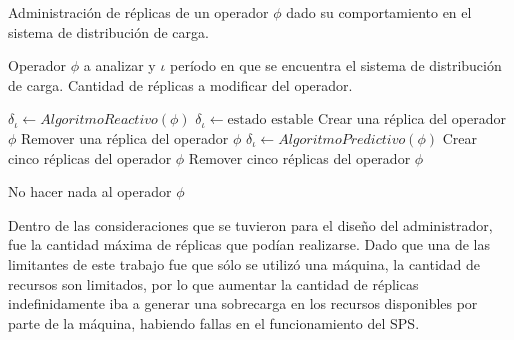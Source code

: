 \begin{algorithm}[!hb]
	\caption{Administración de réplicas de un operador $\phi$ dado su comportamiento en el sistema de distribución de carga.}
	\label{alg:administracion}
	\begin{algorithmic}[1]
	\REQUIRE Operador $\phi$ a analizar y $\iota$ período en que se encuentra el sistema de distribución de carga.
	\ENSURE Cantidad de réplicas a modificar del operador.	
	
		\STATE $\delta_{\iota} \leftarrow AlgoritmoReactivo(\phi)$
				\STATE $\delta_{\iota} \leftarrow \text{estado estable}$ 
				\RETURN Crear una réplica del operador $\phi$
			\ENDIF
			\RETURN Remover una réplica del operador $\phi$
		\ENDIF 
	\ELSE
		\STATE $\delta_{\iota} \leftarrow AlgoritmoPredictivo(\phi)$
				\RETURN Crear cinco réplicas del operador $\phi$
			\ENDIF
			\RETURN Remover cinco réplicas del operador $\phi$
		\ENDIF
	\ENDIF
	
	\RETURN No hacer nada al operador $\phi$
	
	\end{algorithmic}
\end{algorithm}

Dentro de las consideraciones que se tuvieron para el diseño del administrador, fue la cantidad máxima de réplicas que podían realizarse. Dado que una de las limitantes de este trabajo fue que sólo se utilizó una máquina, la cantidad de recursos son limitados, por lo que aumentar la cantidad de réplicas indefinidamente iba a generar una sobrecarga en los recursos disponibles por parte de la máquina, habiendo fallas en el funcionamiento del SPS.